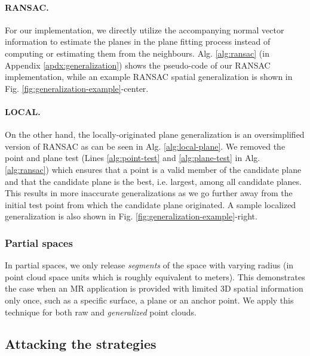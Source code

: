 \paragraph{\textbf{RANSAC.}}

For our implementation, we directly utilize the accompanying normal vector information to estimate the planes in the plane fitting process instead of computing or estimating them from the neighbours. Alg. \ref{alg:ransac} (in Appendix \ref{apdx:generalization}) shows the pseudo-code of our RANSAC implementation, while an example RANSAC spatial generalization is shown in Fig. \ref{fig:generalization-example}-center.


\paragraph{\textbf{LOCAL.}}

On the other hand, the locally-originated plane generalization is an oversimplified version of RANSAC as can be seen in Alg. \ref{alg:local-plane}. We removed the point and plane test (Lines \ref{alg:point-test} and \ref{alg:plane-test} in Alg. \ref{alg:ransac}) which ensures that a point is a valid member of the candidate plane and that the candidate plane is the best, i.e. largest, among all candidate planes. This results in more inaccurate generalizations as we go further away from the initial test point from which the candidate plane originated. A sample localized generalization is also shown in Fig. \ref{fig:generalization-example}-right.

\subsubsection{Partial spaces}\label{subsubsec:partial-spaces}
In partial spaces, we only release \textit{segments} of the space with varying radius (in point cloud space units which is roughly equivalent to meters). This demonstrates the case when an MR application is provided with limited 3D spatial information only once, such as a specific surface, a plane or an anchor point. We apply this technique for both raw and \textit{generalized} point clouds.


\subsection{Attacking the strategies}\label{subsec:attack}

